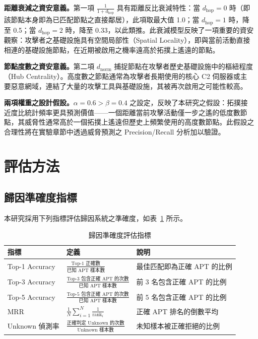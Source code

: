 \begin{ZhChapter}
\textbf{距離衰減之資安意義。}第一項 $\frac{1}{1+d_{\text{hop}}}$ 具有距離反比衰減特性：當 $d_{\text{hop}} = 0$ 時（即該節點本身即為已匹配節點之直接鄰居），此項取最大值 1.0；當 $d_{\text{hop}} = 1$ 時，降至 0.5；當 $d_{\text{hop}} = 2$ 時，降至 0.33，以此類推。此衰減模型反映了一項重要的資安觀察：攻擊者之基礎設施具有空間局部性（Spatial Locality），即與當前活動直接相連的基礎設施節點，在近期被啟用之機率遠高於拓撲上遙遠的節點。

\textbf{節點度數之資安意義。}第二項 $d_{\text{norm}}$ 捕捉節點在攻擊者歷史基礎設施中的樞紐程度（Hub Centrality）。高度數之節點通常為攻擊者長期使用的核心 C2 伺服器或主要惡意網域，連結了大量的攻擊工具與基礎設施，其被再次啟用之可能性較高。

\textbf{兩項權重之設計假設。}$\alpha = 0.6 > \beta = 0.4$ 之設定，反映了本研究之假設：拓撲接近度比統計頻率更具預測價值——一個距離當前攻擊活動僅一步之遙的低度數節點，其威脅性通常高於一個拓撲上遙遠但歷史上頻繁使用的高度數節點。此假設之合理性將在實驗章節中透過威脅預測之 Precision/Recall 分析加以驗證。


\section{評估方法}
\label{sec:evaluation}

\subsection{歸因準確度指標}
\label{subsec:attribution-metrics}

本研究採用下列指標評估歸因系統之準確度，如表~\ref{tab:attribution-metrics} 所示。

\begin{table}[htbp]
    \centering
    \caption{歸因準確度評估指標}
    \label{tab:attribution-metrics}
    \renewcommand\arraystretch{1.3}
    \begin{tabular}{l l l}
        \hline
        \textbf{指標} & \textbf{定義} & \textbf{說明} \\
        \hline
        Top-1 Accuracy & $\frac{\text{Top-1 正確數}}{\text{已知 APT 樣本數}}$ & 最佳匹配即為正確 APT 的比例 \\[4pt]
        Top-3 Accuracy & $\frac{\text{Top-3 包含正確 APT 的次數}}{\text{已知 APT 樣本數}}$ & 前 3 名包含正確 APT 的比例 \\[4pt]
        Top-5 Accuracy & $\frac{\text{Top-5 包含正確 APT 的次數}}{\text{已知 APT 樣本數}}$ & 前 5 名包含正確 APT 的比例 \\[4pt]
        MRR & $\frac{1}{N}\sum_{i=1}^{N}\frac{1}{\text{rank}_i}$ & 正確 APT 排名的倒數平均 \\[4pt]
        Unknown 偵測率 & $\frac{\text{正確判定 Unknown 的次數}}{\text{Unknown 樣本數}}$ & 未知樣本被正確拒絕的比例 \\
        \hline
    \end{tabular}
\end{table}


\end{ZhChapter}
